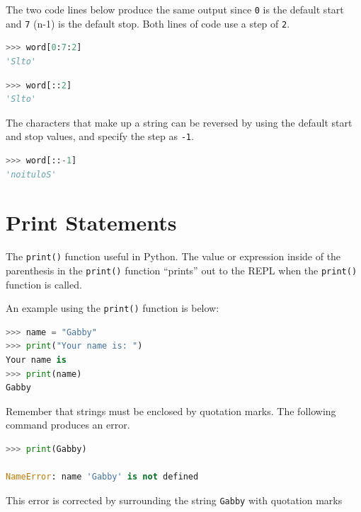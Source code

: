 \documentclass{book}
\begin{document}
The two code lines below produce the same output since \lstinline!0! is
the default start and \lstinline!7! (n-1) is the default stop. Both
lines of code use a step of \lstinline!2!.

\begin{lstlisting}[language=Python]
>>> word[0:7:2]
'Slto'
\end{lstlisting}

\begin{lstlisting}[language=Python]
>>> word[::2]
'Slto'
\end{lstlisting}

The characters that make up a string can be reversed by using the
default start and stop values, and specify the step as \lstinline!-1!.

\begin{lstlisting}[language=Python]
>>> word[::-1]
'noituloS'
\end{lstlisting}
    




    
        \section{Print Statements}\label{print-statements}
    




    
        The \lstinline!print()! function useful in Python. The value or
expression inside of the parenthesis in the \lstinline!print()! function
``prints'' out to the REPL when the \lstinline!print()! function is
called.

An example using the \lstinline!print()! function is below:

\begin{lstlisting}[language=Python]
>>> name = "Gabby"
>>> print("Your name is: ")
Your name is
>>> print(name)
Gabby
\end{lstlisting}

Remember that strings must be enclosed by quotation marks. The following
command produces an error.

\begin{lstlisting}[language=Python]
>>> print(Gabby)

NameError: name 'Gabby' is not defined
\end{lstlisting}

This error is corrected by surrounding the string \lstinline!Gabby! with
quotation marks
\end{document}
